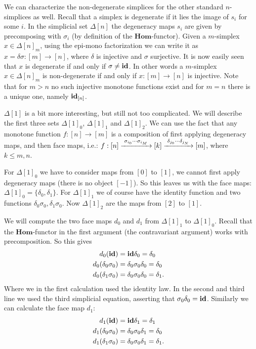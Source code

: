 We can characterize the non-degenerate simplices for the other standard $n$-simplices as well. Recall that a simplex is degenerate if it lies the image of $s_i$ for some $i$. In the simplicial set $\Delta[n]$ the degeneracy maps $s_i$ are given by precomposing with $\sigma_i$ (by definition of the $\mathbf{Hom}$-functor). Given a $m$-simplex $x \in \Delta[n]_m$, using the epi-mono factorization we can write it as $x = \delta\sigma: [m] \to [n]$, where $\delta$ is injective and $\sigma$ surjective. It is now easily seen that $x$ is degenerate if and only if $\sigma \neq \mathbf{id}$. In other words a $m$-simplex $x \in \Delta[n]_m$ is non-degenerate if and only if $x: [m] \to [n]$ is injective. Note that for $m>n$ no such injective monotone functions exist and for $m=n$ there is a unique one, namely $\mathbf{id}_{[n]}$.

\begin{example}
	$\Delta[1]$ is a bit more interesting, but still not too complicated. We will describe the first three sets $\Delta[1]_0$, $\Delta[1]_1$ and $\Delta[1]_2$. We can use the fact that any monotone function $f: [n] \to [m]$ is a composition of first applying degeneracy maps, and then face maps, i.e.: $f: [n] \xrightarrow{\,\,{\sigma_{i_0} \cdots \sigma_{i_M}}\,\,} [k] \xrightarrow{\,\,{\delta_{j_0} \cdots \delta_{j_N}}\,\,} [m]$, where $k \leq m, n$.

	For $\Delta[1]_0$ we have to consider maps from $[0]$ to $[1]$, we cannot first apply degeneracy maps (there is no object $[-1]$). So this leaves us with the face maps: $\Delta[1]_0 = \{\delta_0, \delta_1\}$. For $\Delta[1]_1$ we of course have the identity function and two functions $\delta_0\sigma_0, \delta_1\sigma_0$. Now $\Delta[1]_2$ are the maps from $[2]$ to $[1]$.

	We will compute the two face maps $d_0$ and $d_1$ from $\Delta[1]_1$ to $\Delta[1]_0$. Recall that the $\mathbf{Hom}$-functor in the first argument (the contravariant argument) works with precomposition. So this gives
	\begin{align*}
		d_0(\mathbf{id}) &= \mathbf{id} \delta_0 = \delta_0 \\
		d_0(\delta_0\sigma_0) &= \delta_0 \sigma_0 \delta_0 = \delta_0 \\
		d_0(\delta_1\sigma_0) &= \delta_0 \sigma_0 \delta_0 = \delta_1.
	\end{align*}
	Where we in the first calculation used the identity law. In the second and third line we used the third simplicial equation, asserting that $\sigma_0 \delta_0 = \mathbf{id}$. Similarly we can calculate the face map $d_1$:
	\begin{align*}
		d_1(\mathbf{id}) &= \mathbf{id} \delta_1 = \delta_1 \\
		d_1(\delta_0\sigma_0) &= \delta_0 \sigma_0 \delta_1 = \delta_0 \\
		d_1(\delta_1\sigma_0) &= \delta_0 \sigma_0 \delta_1 = \delta_1.
	\end{align*}


\end{example}
